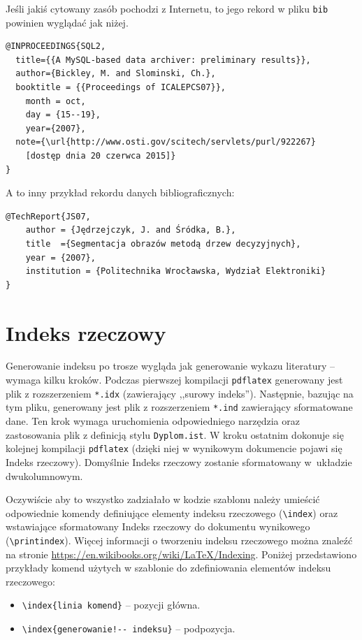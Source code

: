 Jeśli jakiś cytowany zasób pochodzi z Internetu, to jego rekord w pliku \texttt{bib} powinien wyglądać jak niżej.
\begin{lstlisting}[basicstyle=\footnotesize\ttfamily]
@INPROCEEDINGS{SQL2, 
  title={{A MySQL-based data archiver: preliminary results}}, 
  author={Bickley, M. and Slominski, Ch.},
  booktitle = {{Proceedings of ICALEPCS07}},
	month = oct,
	day = {15--19},
	year={2007}, 
  note={\url{http://www.osti.gov/scitech/servlets/purl/922267} 
	[dostęp dnia 20 czerwca 2015]}
}
\end{lstlisting}
A to inny przykład rekordu danych bibliograficznych:
\begin{lstlisting}[basicstyle=\footnotesize\ttfamily]
@TechReport{JS07,
	author = {Jędrzejczyk, J. and Śródka, B.},
	title  ={Segmentacja obrazów metodą drzew decyzyjnych},
	year = {2007},
	institution = {Politechnika Wrocławska, Wydział Elektroniki}
}
\end{lstlisting}

\section{Indeks rzeczowy}
\label{sec:indeks}
Generowanie indeksu  po trosze wygląda jak generowanie wykazu literatury -- wymaga kilku kroków. Podczas pierwszej kompilacji \texttt{pdflatex} generowany jest plik z rozszerzeniem \texttt{*.idx} (zawierający ,,surowy indeks''). Następnie, bazując na tym pliku, generowany jest plik z rozszerzeniem \texttt{*.ind} zawierający sformatowane dane. Ten krok wymaga uruchomienia odpowiedniego narzędzia oraz zastosowania plik z definicją stylu \texttt{Dyplom.ist}. W kroku ostatnim dokonuje się kolejnej kompilacji \texttt{pdflatex} (dzięki niej w wynikowym dokumencie pojawi się Indeks rzeczowy). Domyślnie Indeks rzeczowy zostanie sformatowany w~układzie dwukolumnowym.

Oczywiście aby to wszystko zadziałało w kodzie szablonu należy umieścić odpowiednie komendy definiujące elementy indeksu rzeczowego (\verb?\index?) oraz wstawiające sformatowany Indeks rzeczowy do dokumentu wynikowego (\verb?\printindex?). Więcej informacji o tworzeniu indeksu rzeczowego można znaleźć na stronie \url{https://en.wikibooks.org/wiki/LaTeX/Indexing}. Poniżej przedstawiono przykłady komend użytych w szablonie do zdefiniowania elementów indeksu rzeczowego:
\begin{itemize}
\item \verb?\index{linia komend}? -- pozycji główna.
\item \verb?\index{generowanie!-- indeksu}? -- podpozycja.
\end{itemize}

